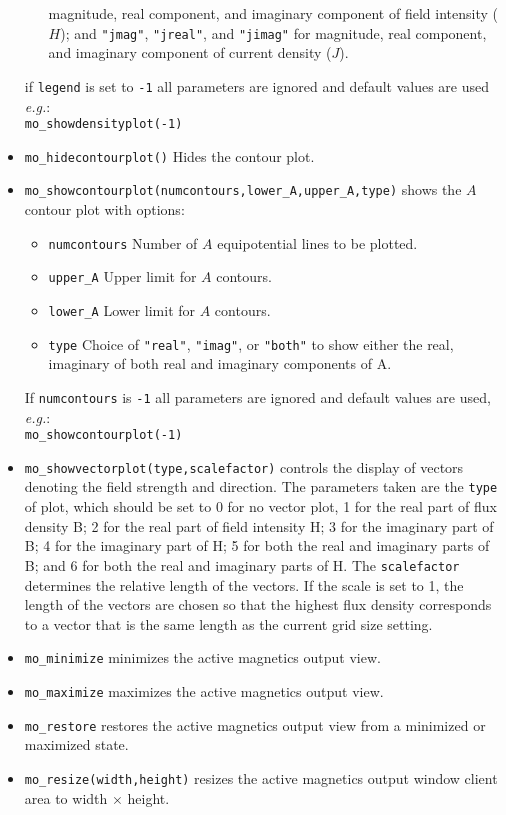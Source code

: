 \begin{itemize}
\begin{itemize}
        magnitude, real component, and imaginary component of field intensity ($H$);
		and {\tt "jmag"}, {\tt "jreal"}, and {\tt "jimag"} for
        magnitude, real component, and imaginary component of current density ($J$).
        \end{itemize}
        if {\tt legend} is set to {\tt -1} all parameters are ignored and default values are
        used {\em e.g.}: \\ \verb+mo_showdensityplot(-1)+
\item{\verb+mo_hidecontourplot()+} Hides the contour plot.
\item{\verb+mo_showcontourplot(numcontours,lower_A,upper_A,type)+}
shows the $A$ contour plot with options:
        \begin{itemize}
        \item{\tt numcontours} Number of $A$ equipotential lines
        to be plotted.
        \item{\verb+upper_A+} Upper limit for $A$ contours.
        \item{\verb+lower_A+} Lower limit for $A$ contours.
                \item{\verb+type+} Choice of {\tt "real"}, {\tt "imag"}, or {\tt "both"}
                        to show either the real, imaginary of both real and imaginary components of A.
        \end{itemize}
        If {\tt numcontours} is {\tt -1} all parameters are ignored and default
        values are used, {\em e.g.}: \\ \verb+mo_showcontourplot(-1)+

\item{\tt mo\_showvectorplot(type,scalefactor)}
controls the display of vectors denoting the field strength and
direction. The parameters taken are the \texttt{type} of plot,
which should be set to 0 for no vector plot,  1 for the real part of flux density B;
2 for the real part of field intensity H; 3 for the imaginary part of B;
4 for the imaginary part of H; 5 for both the real and imaginary parts of B;
and 6 for both the real and imaginary parts of H. The \texttt{scalefactor}
determines the relative length of the vectors. If the scale is set
to 1, the length of the vectors are chosen so that the highest flux
density corresponds to a vector that is the same length as the
current grid size setting.


\item{\tt mo\_minimize} minimizes the active magnetics output view.
\item{\tt mo\_maximize} maximizes the active magnetics output view.
\item{\tt mo\_restore} restores the active magnetics output view from a
 minimized or maximized state.
\item{\tt mo\_resize(width,height)} resizes the active magnetics output
 window client area to width $\times$ height.
\end{itemize}

